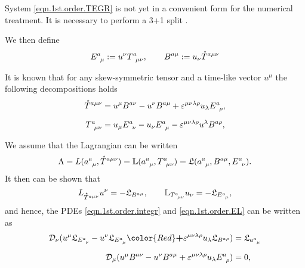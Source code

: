 \documentclass[
10pt, %
a4paper, %
oneside, %
headinclude,footinclude, %
BCOR5mm, %
]{scrartcl}
\newcommand{\tetr}[2]{a^{#1}_{\phantom{#1}#2}}
\newcommand{\D}[1]{\mathcal{D}_{#1}} %
\newcommand{\Tors}[2]{T^{#1}_{\phantom{a}#2}}
\newcommand{\ET}[2]{E^{#1}_{\phantom{#1}#2}}	%
\newcommand{\BT}[2]{B^{#1#2}}	%
\newcommand{\Laghodge}{L}%
\newcommand{\Lagtors}{\mathbb{L}}%
\newcommand{\LagBE}{\mathfrak{L}}%
\newcommand{\veps}{\varepsilon}
\newcommand{\HT}[1]{\accentset{\star}{T}^{#1}}
\begin{document}
System \eqref{eqn.1st.order.TEGR} is not yet in a convenient form for the numerical treatment. It 
is necessary to perform a 3+1 split \cite{Alcubierre2008}. 


We then define 
\begin{equation}
\ET{a}{\mu} := u^\nu \Tors{a}{\mu\nu}, \qquad  \BT{a}{\mu} := u_\nu\HT{a\mu\nu}
\end{equation}

It is known that for any skew-symmetric tensor and a time-like vector $ u^\mu $ the following 
decompositions holds
\begin{subequations}\label{eqn.T.decompos}
\begin{align}
\HT{a\mu\nu} &= u^\mu \BT{a}{\nu} - u^\nu \BT{a}{\mu} + \veps^{\mu\nu\lambda\rho}u_\lambda 
\ET{a}{\rho},\\[2mm]
\Tors{a}{\mu\nu} &= u_\mu \ET{a}{\nu} - u_\nu \ET{a}{\mu} - \veps^{\mu\nu\lambda\rho}u^\lambda 
\BT{a}{\rho},
\end{align}
\end{subequations}

We assume that the Lagrangian can be written 
\begin{equation}
\Lambda = \Laghodge(\tetr{a}{\mu},\HT{a\mu\nu}) = \Lagtors(\tetr{a}{\mu},\Tors{a}{\mu\nu}) = 
\LagBE(\tetr{a}{\mu},\BT{a}{\mu},\ET{a}{\nu}).
\end{equation}
It then can be shown that 
\begin{equation}
\Laghodge_{\HT{a\mu\nu}}u^\nu = -\LagBE_{\BT{a}{\mu}}, \qquad \Lagtors_{\Tors{a}{\mu\nu}}u_\nu = 
-\LagBE_{\ET{a}{\mu}},
\end{equation}
and hence, the PDEs \eqref{eqn.1st.order.integr} and \eqref{eqn.1st.order.EL} can be written as 
\begin{subequations}\label{eqn.tors.BE}
	\begin{align}
		\D{\nu}(u^\mu \LagBE_{\ET{a}{\nu}} - u^\nu\LagBE_{\ET{a}{\mu}} {\color{Red}\bm{+}} 
		\veps^{\mu\nu\lambda\rho}u_\lambda\LagBE_{\BT{a}{\rho}}) &=\LagBE_{\tetr{a}{\mu}}\\[2mm]
		\D{\mu}(u^\mu \BT{a}{\nu} - u^\nu\BT{a}{\mu} + 
		\veps^{\mu\nu\lambda\rho}u_\lambda\ET{a}{\rho}) &= 0,
	\end{align}
\end{subequations}
\end{document}
